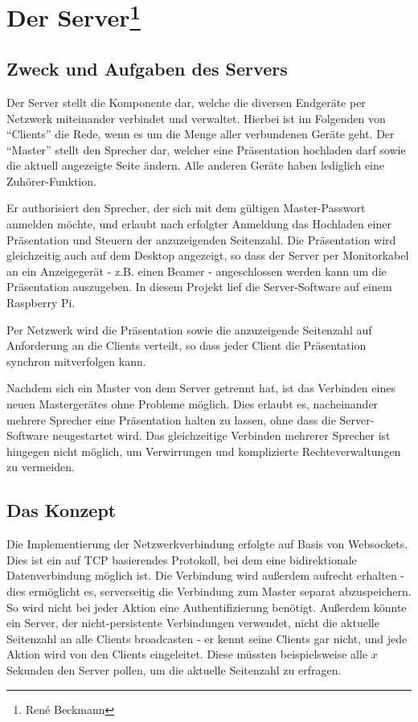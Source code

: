 \chapter[Der Server]{Der Server\footnote{René Beckmann}}
\section{Zweck und Aufgaben des Servers}
\label{server}
Der Server stellt die Komponente dar, welche die diversen Endgeräte per Netzwerk miteinander verbindet und verwaltet. Hierbei ist im Folgenden von "`Clients"' die Rede, wenn es um die Menge aller verbundenen Geräte geht. Der "`Master"' stellt den Sprecher dar, welcher eine Präsentation hochladen darf sowie die aktuell angezeigte Seite ändern. Alle anderen Geräte haben lediglich eine Zuhörer-Funktion.

Er authorisiert den Sprecher, der sich mit dem gültigen Master-Passwort anmelden möchte, und erlaubt nach erfolgter Anmeldung das Hochladen einer Präsentation und Steuern der anzuzeigenden Seitenzahl. Die Präsentation wird gleichzeitig auch auf dem Desktop angezeigt, so dass der Server per Monitorkabel an ein Anzeigegerät - z.B. einen Beamer - angeschlossen werden kann um die Präsentation auszugeben. In diesem Projekt lief die Server-Software auf einem Raspberry Pi.

Per Netzwerk wird die Präsentation sowie die anzuzeigende Seitenzahl auf Anforderung an die Clients verteilt, so dass jeder Client die Präsentation synchron mitverfolgen kann.

Nachdem sich ein Master von dem Server getrennt hat, ist das Verbinden eines neuen Mastergerätes ohne Probleme möglich. Dies erlaubt es, nacheinander mehrere Sprecher eine Präsentation halten zu lassen, ohne dass die Server-Software neugestartet wird. Das gleichzeitige Verbinden mehrerer Sprecher ist hingegen nicht möglich, um Verwirrungen und komplizierte Rechteverwaltungen zu vermeiden.

\section{Das Konzept}
Die Implementierung der Netzwerkverbindung erfolgte auf Basis von Websockets. Dies ist ein auf TCP basierendes Protokoll, bei dem eine bidirektionale Datenverbindung möglich ist. Die Verbindung wird außerdem aufrecht erhalten - dies ermöglicht es, serverseitig die Verbindung zum Master separat abzuspeichern. So wird nicht bei jeder Aktion eine Authentifizierung benötigt. Außerdem könnte ein Server, der nicht-persistente Verbindungen verwendet, nicht die aktuelle Seitenzahl an alle Clients broadcasten - er kennt seine Clients gar nicht, und jede Aktion wird von den Clients eingeleitet. Diese müssten beispielsweise alle $x$ Sekunden den Server pollen, um die aktuelle Seitenzahl zu erfragen.


